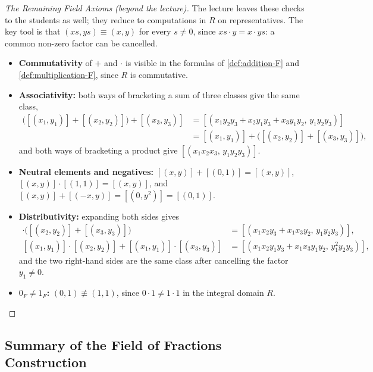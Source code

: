 \begin{content}
\begin{proof}[The Remaining Field Axioms (beyond the lecture)]
The lecture leaves these checks to the students as well; they reduce to computations in $R$ on representatives. The key tool is that $(x s, y s) \equiv (x, y)$ for every $s \neq 0$, since $x s \cdot y = x \cdot y s$: a common non-zero factor can be cancelled.
\begin{itemize}
    \item \textbf{Commutativity} of $+$ and $\cdot$ is visible in the formulas of \cref{def:addition-F} and \cref{def:multiplication-F}, since $R$ is commutative.
    \item \textbf{Associativity:} both ways of bracketing a sum of three classes give the same class,
    \begin{align*}
    \bigl([(x_1, y_1)] + [(x_2, y_2)]\bigr) + [(x_3, y_3)]
    &= [(x_1 y_2 y_3 + x_2 y_1 y_3 + x_3 y_1 y_2, \, y_1 y_2 y_3)] \\
    &= [(x_1, y_1)] + \bigl([(x_2, y_2)] + [(x_3, y_3)]\bigr),
    \end{align*}
    and both ways of bracketing a product give $[(x_1 x_2 x_3, \, y_1 y_2 y_3)]$.
    \item \textbf{Neutral elements and negatives:} $[(x, y)] + [(0, 1)] = [(x, y)]$, $[(x, y)] \cdot [(1, 1)] = [(x, y)]$, and $[(x, y)] + [(-x, y)] = [(0, y^2)] = [(0, 1)]$.
    \item \textbf{Distributivity:} expanding both sides gives
    \begin{align*}
    [(x_1, y_1)] \cdot \bigl([(x_2, y_2)] + [(x_3, y_3)]\bigr) &= [(x_1 x_2 y_3 + x_1 x_3 y_2, \, y_1 y_2 y_3)], \\
    [(x_1, y_1)] \cdot [(x_2, y_2)] + [(x_1, y_1)] \cdot [(x_3, y_3)] &= [(x_1 x_2 y_1 y_3 + x_1 x_3 y_1 y_2, \, y_1^2 y_2 y_3)],
    \end{align*}
    and the two right-hand sides are the same class after cancelling the factor $y_1 \neq 0$.
    \item \textbf{$0_F \neq 1_F$:} $(0, 1) \not\equiv (1, 1)$, since $0 \cdot 1 \neq 1 \cdot 1$ in the integral domain $R$.
\end{itemize}
\end{proof}
\end{content}

\subsection{Summary of the Field of Fractions Construction}

